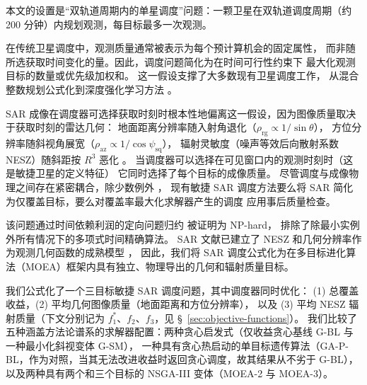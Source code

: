 \documentclass[preprint,12pt,authoryear]{elsarticle}
\begin{document}
本文的设置是“双轨道周期内的单星调度”问题：一颗卫星在双轨道调度周期（约 200 分钟）内规划观测，每目标最多一次观测。

在传统卫星调度中，观测质量通常被表示为每个预计算机会的固定属性，
而非随所选获取时间变化的量。因此，调度问题简化为在时间可行性约束下
最大化观测目标的数量或优先级加权和。
这一假设支撑了大多数现有卫星调度工作，
从混合整数规划公式化到深度强化学习方法 \citep{Chen2025NeuralPriority}。

SAR 成像在调度器可选择获取时刻时根本性地偏离这一假设，因为图像质量取决于获取时刻的雷达几何：
地面距离分辨率随入射角退化（$\rho_{\text{rg}} \propto 1/\sin\theta$），
方位分辨率随斜视角展宽（$\rho_{\text{az}} \propto 1/\cos\psi_{\text{sq}}$），
辐射灵敏度（噪声等效后向散射系数 NESZ）随斜距按 $R^3$ 恶化 \citep{Cumming2005}。
当调度器可以选择在可见窗口内的观测时刻时（这是敏捷卫星的定义特征）
它同时选择了每个目标的成像质量。
尽管调度与成像物理之间存在紧密耦合，除少数例外 \citep{Kramer2025SARVis}，
现有敏捷 SAR 调度方法要么将 SAR 简化为仅覆盖目标，要么对覆盖率最大化求解器产生的调度
应用事后质量检查。

该问题通过时间依赖利润的定向问题归约 \citep{Peng2019Orienteering} 被证明为 NP-hard，
排除了除最小实例外所有情况下的多项式时间精确算法。
SAR 文献已建立了 NESZ 和几何分辨率作为观测几何函数的成熟模型 \citep{Curlander1991,Cumming2005}，
因此，我们将 SAR 调度公式化为在多目标进化算法（MOEA）框架内具有独立、物理导出的几何和辐射质量目标。

我们公式化了一个三目标敏捷 SAR 调度问题，其中调度器同时优化：
(1) 总覆盖收益，(2) 平均几何图像质量（地面距离和方位分辨率），
以及 (3) 平均 NESZ 辐射质量（下文分别记为 $f_1^*$、$f_2$、$f_3$，见 \S~\ref{sec:objective-functions}）。
我们比较了五种涵盖方法论谱系的求解器配置：两种贪心启发式（仅收益贪心基线 G-BL 与一种最小化斜视变体 G-SM），
一种具有贪心热启动的单目标遗传算法（GA-P-BL，作为对照，当其无法改进收益时返回贪心调度，故其结果从不劣于 G-BL），以及两种具有两个和三个目标的 NSGA-III 变体（MOEA-2 与 MOEA-3）。
\end{document}
